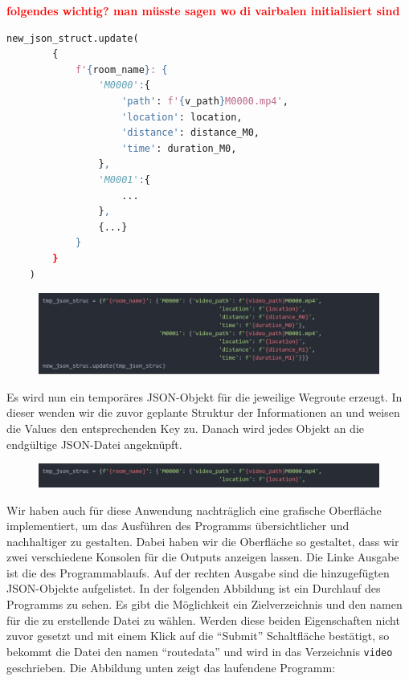 \textcolor{red}{\textbf{folgendes wichtig? man müsste sagen wo di vairbalen initialisiert sind}}
\begin{lstlisting}[language=Python]
    new_json_struct.update(
        {
            f'{room_name}: {
                'M0000':{
                    'path': f'{v_path}M0000.mp4',
                    'location': location,
                    'distance': distance_M0,
                    'time': duration_M0,
                },
                'M0001':{
                    ...
                },
                {...}
            }
        }
    )
\end{lstlisting}
\begin{figure}[H]
    \includegraphics[width=\textwidth]{Figures/3DNavigator/code08.jpg}
    \centering
\end{figure} \vspace{-3.5mm}

Es wird nun ein temporäres JSON-Objekt für die jeweilige Wegroute erzeugt. In dieser wenden wir die zuvor geplante Struktur der Informationen an und weisen die Values den entsprechenden Key zu. Danach wird jedes Objekt an die endgültige JSON-Datei angeknüpft.

\begin{figure}[H]
    \includegraphics[width=\textwidth]{Figures/3DNavigator/code09.jpg}
    \centering
\end{figure} \vspace{-3.5mm}

Wir haben auch für diese Anwendung nachträglich eine grafische Oberfläche implementiert, um das Ausführen des Programms übersichtlicher und nachhaltiger zu gestalten. Dabei haben wir die Oberfläche so gestaltet, dass wir zwei verschiedene Konsolen für die Outputs anzeigen lassen. Die Linke Ausgabe ist die des Programmablaufs. Auf der rechten Ausgabe sind die hinzugefügten JSON-Objekte aufgelistet. In der folgenden Abbildung ist ein Durchlauf des Programms zu sehen. Es gibt die Möglichkeit ein Zielverzeichnis und den namen für die zu erstellende Datei zu wählen. Werden diese beiden Eigenschaften nicht zuvor gesetzt und mit einem Klick auf die ``Submit'' Schaltfläche bestätigt, so bekommt die Datei den namen ``routedata'' und wird in das Verzeichnis \verb|video| geschrieben. Die Abbildung unten zeigt das laufendene Programm:\vspace{-1.5mm}

